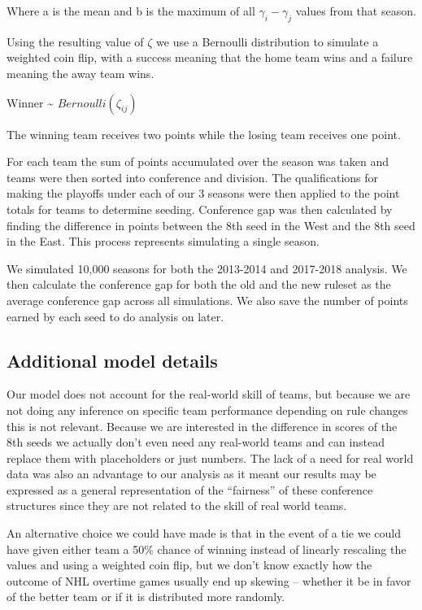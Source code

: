 \documentclass[
]{article}
\begin{document}
Where a is the mean and b is the maximum of all
\(\gamma_{i}-\gamma_{j}\) values from that season.

Using the resulting value of \(\zeta\) we use a Bernoulli distribution
to simulate a weighted coin flip, with a success meaning that the home
team wins and a failure meaning the away team wins.

Winner \textasciitilde{} \(Bernoulli(\zeta_{ij})\)

The winning team receives two points while the losing team receives one
point.

For each team the sum of points accumulated over the season was taken
and teams were then sorted into conference and division. The
qualifications for making the playoffs under each of our 3 seasons were
then applied to the point totals for teams to determine seeding.
Conference gap was then calculated by finding the difference in points
between the 8th seed in the West and the 8th seed in the East. This
process represents simulating a single season.

We simulated 10,000 seasons for both the 2013-2014 and 2017-2018
analysis. We then calculate the conference gap for both the old and the
new ruleset as the average conference gap across all simulations. We
also save the number of points earned by each seed to do analysis on
later.

\hypertarget{additional-model-details}{%
\subsection{Additional model details}\label{additional-model-details}}

Our model does not account for the real-world skill of teams, but
because we are not doing any inference on specific team performance
depending on rule changes this is not relevant. Because we are
interested in the difference in scores of the 8th seeds we actually
don't even need any real-world teams and can instead replace them with
placeholders or just numbers. The lack of a need for real world data was
also an advantage to our analysis as it meant our results may be
expressed as a general representation of the ``fairness'' of these
conference structures since they are not related to the skill of real
world teams.

An alternative choice we could have made is that in the event of a tie
we could have given either team a 50\% chance of winning instead of
linearly rescaling the values and using a weighted coin flip, but we
don't know exactly how the outcome of NHL overtime games usually end up
skewing -- whether it be in favor of the better team or if it is
distributed more randomly.
\end{document}
